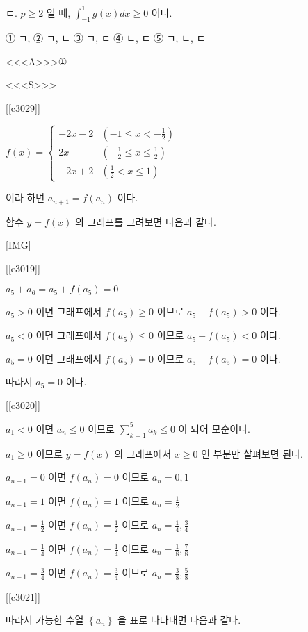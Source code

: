 \documentclass{oblivoir}
\begin{document}
ㄷ. $p \geq 2$ 일 때, $\int_{-1}^{1} g(x) d x \geq 0$ 이다.

① ㄱ,
② ㄱ, ㄴ
③ ㄱ, ㄷ
④ ㄴ, ㄷ
⑤ ㄱ, ㄴ, ㄷ


<<<A>>>①

<<<S>>>

[[c3029]]

$f(x)=\left\{\begin{array}{cl}-2 x-2 & \left(-1 \leq x<-\frac{1}{2}\right) \\ 2 x & \left(-\frac{1}{2} \leq x \leq \frac{1}{2}\right) \\ -2 x+2 & \left(\frac{1}{2}<x \leq 1\right)\end{array}\right.$

이라 하면 $a_{n+1}=f\left(a_{n}\right)$ 이다.

함수 $y=f(x)$ 의 그래프를 그려보면 다음과 같다.

[IMG]

[[c3019]]

$a_{5}+a_{6}=a_{5}+f\left(a_{5}\right)=0$

$a_{5}>0 $ 이면 그래프에서 $ f\left(a_{5}\right) \geq 0 $ 이므로 $a_{5}+f\left(a_{5}\right)>0 $ 이다.

$a_{5}<0 $ 이면 그래프에서 $f\left(a_{5}\right) \leq 0 $ 이므로 $a_{5}+f\left(a_{5}\right)<0 $ 이다.

$a_{5}=0 $ 이면 그래프에서 $f\left(a_{5}\right)=0 $ 이므로 $a_{5}+f\left(a_{5}\right)=0 $ 이다.

따라서 $a_{5}=0$ 이다.

[[c3020]]

$a_{1}<0$ 이면 $a_{n} \leq 0$ 이므로 $\sum_{k=1}^{5} a_{k} \leq 0$ 이 되어 모순이다.

$a_{1} \geq 0$ 이므로 $y=f(x)$ 의 그래프에서 $x \geq 0$ 인 부분만 살펴보면 된다.

$a_{n+1}=0$ 이면 $f\left(a_{n}\right)=0$ 이므로 $a_{n}=0,1$

$a_{n+1}=1$ 이면 $f\left(a_{n}\right)=1$ 이므로 $a_{n}=\frac{1}{2}$

$a_{n+1}=\frac{1}{2}$ 이면 $f\left(a_{n}\right)=\frac{1}{2}$ 이므로 $a_{n}=\frac{1}{4}, \frac{3}{4}$

$a_{n+1}=\frac{1}{4}$ 이면 $f\left(a_{n}\right)=\frac{1}{4} $ 이므로 $a_{n}=\frac{1}{8}, \frac{7}{8}$

$a_{n+1}=\frac{3}{4}$ 이면 $f\left(a_{n}\right)=\frac{3}{4} $ 이므로 $a_{n}=\frac{3}{8}, \frac{5}{8}$

[[c3021]]

따라서 가능한 수열 $\left\{a_{n}\right\}$ 을 표로 나타내면 다음과 같다.
\end{document}
